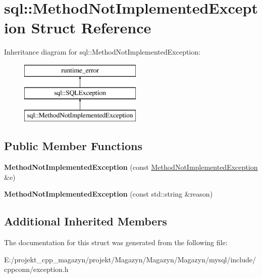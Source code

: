 \hypertarget{structsql_1_1_method_not_implemented_exception}{}\section{sql\+:\+:Method\+Not\+Implemented\+Exception Struct Reference}
\label{structsql_1_1_method_not_implemented_exception}
Inheritance diagram for sql\+:\+:Method\+Not\+Implemented\+Exception\+:\begin{figure}[H]
\begin{center}
\leavevmode
\includegraphics[height=3.000000cm]{structsql_1_1_method_not_implemented_exception}
\end{center}
\end{figure}
\subsection*{Public Member Functions}
\begin{DoxyCompactItemize}
\item 
\hypertarget{structsql_1_1_method_not_implemented_exception_a7e3e43c53ae4c0f108a262656eb534eb}{}\label{structsql_1_1_method_not_implemented_exception_a7e3e43c53ae4c0f108a262656eb534eb} 
{\bfseries Method\+Not\+Implemented\+Exception} (const \hyperlink{structsql_1_1_method_not_implemented_exception}{Method\+Not\+Implemented\+Exception} \&e)
\item 
\hypertarget{structsql_1_1_method_not_implemented_exception_aa71492d2aa8821232eeb9b9bd4c41d37}{}\label{structsql_1_1_method_not_implemented_exception_aa71492d2aa8821232eeb9b9bd4c41d37} 
{\bfseries Method\+Not\+Implemented\+Exception} (const std\+::string \&reason)
\end{DoxyCompactItemize}
\subsection*{Additional Inherited Members}


The documentation for this struct was generated from the following file\+:\begin{DoxyCompactItemize}
\item 
E\+:/projekt\+\_\+cpp\+\_\+magazyn/projekt/\+Magazyn/\+Magazyn/\+Magazyn/mysql/include/cppconn/exception.\+h\end{DoxyCompactItemize}
